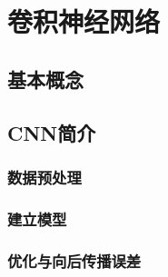 \chapter{卷积神经网络}

\section{基本概念}

\section{CNN简介}

\subsection{数据预处理}

\subsection{建立模型}

\subsection{优化与向后传播误差}